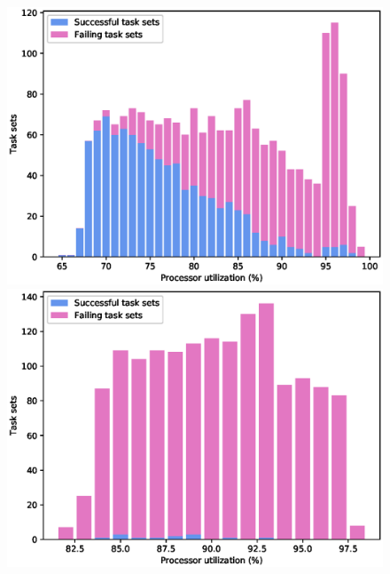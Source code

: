 \begin{figure}[htpb]
    \centering
    \hspace*{-2.4cm}
    \begin{minipage}{0.62\textwidth}
        \includegraphics[width=\textwidth]{figures/rm_guarantee_pass_percentage.eps}
    \end{minipage}%
    \begin{minipage}{0.62\textwidth}
        \includegraphics[width=\textwidth]{figures/rm_guarantee_fail_percentage.eps}
    \end{minipage}
    \hspace*{-2.4cm}
    \begin{minipage}{0.62\textwidth}

\end{minipage}
\end{figure}
